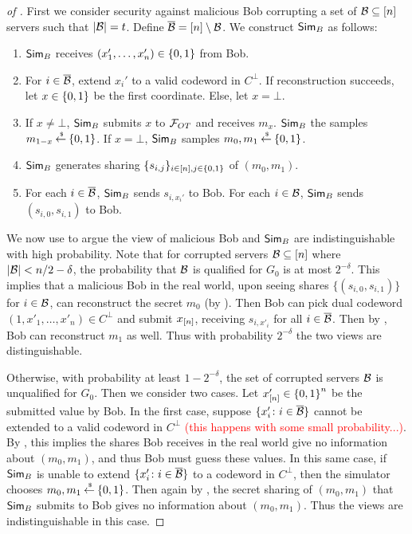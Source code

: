 \begin{proof}[of ]
	First we consider security against malicious Bob corrupting a set of ${\mathcal B} \subseteq[n]$ servers such that $|{\mathcal B}| = t$.
	Define $\overline{{\mathcal B}} = [n]\setminus{\mathcal B}$.
	We construct $\mathsf{Sim}_B$ as follows:
	\begin{enumerate}
		\item $\mathsf{Sim}_B$ receives $(x_1',\dotsc, x_n') \in {\{0,1\}}$ from Bob.
		\item For $i \in \overline{{\mathcal B}}$, extend $x_i'$ to a valid codeword in $C^\perp$.
		If reconstruction succeeds, let $x \in {\{0,1\}}$ be the first coordinate.
		Else, let $x = \bot$.
		\item If $x \neq \bot$, $\mathsf{Sim}_B$ submits $x$ to ${\mathcal F}_{OT}$ and receives $m_x$.
		$\mathsf{Sim}_B$ the samples $m_{1-x} \mathbin{\stackrel{\mbox{\,\tiny \$}}{\gets}} {\{0,1\}}$.
		If $x = \bot$, $\mathsf{Sim}_B$ samples $m_0,m_1 \mathbin{\stackrel{\mbox{\,\tiny \$}}{\gets}} {\{0,1\}}$.
		\item $\mathsf{Sim}_B$ generates sharing $\{ s_{i,j} \}_{i \in [n], j \in {\{0,1\}}}$ of $(m_0, m_1)$.
		\item For each $i \in \overline{{\mathcal B}}$, $\mathsf{Sim}_B$ sends $s_{i, x_i'}$ to Bob.
		For each $i \in {\mathcal B}$, $\mathsf{Sim}_B$ sends $(s_{i,0}, s_{i,1})$ to Bob.
	\end{enumerate}
	We now use  to argue the view of malicious Bob and $\mathsf{Sim}_B$ are indistinguishable with high probability.
	Note that for corrupted servers ${\mathcal B} \subseteq [n]$ where $|{\mathcal B}| < n/2 - \delta$, the probability that ${\mathcal B}$ is qualified for $G_0$ is at most $2^{-\delta}$.
	This implies that a malicious Bob in the real world, upon seeing shares $\{ (s_{i,0}, s_{i,1}) \}$ for $i \in {\mathcal B}$, can reconstruct the secret $m_0$ (by ).
	Then Bob can pick dual codeword $(1, x'_1,\dotsc,x'_n) \in C^\perp$ and submit $x_{[n]}$, receiving $s_{i, x'_i}$ for all $i \in \overline{{\mathcal B}}$.
	Then by , Bob can reconstruct $m_1$ as well.
	Thus with probability $2^{-\delta}$ the two views are distinguishable.
	
	Otherwise, with probability at least $1 - 2^{-\delta}$, the set of corrupted servers ${\mathcal B}$ is unqualified for $G_0$.
	Then we consider two cases.
	Let $x'_{[n]} \in {\{0,1\}}^n$ be the submitted value by Bob.
	In the first case, suppose $\{ x_i' \colon i \in \overline{{\mathcal B}} \}$ cannot be extended to a valid codeword in $C^\perp$ \textcolor{red}{(this happens with some small probability...)}.
	By , this implies the shares Bob receives in the real world give no information about $(m_0,m_1)$, and thus Bob must guess these values.
	In this same case, if $\mathsf{Sim}_B$ is unable to extend $\{ x_i' \colon i \in \overline{{\mathcal B}} \}$ to a codeword in $C^\perp$, then the simulator chooses $m_0, m_1 \mathbin{\stackrel{\mbox{\,\tiny \$}}{\gets}} {\{0,1\}}$.
	Then again by , the secret sharing of $(m_0, m_1)$ that $\mathsf{Sim}_B$ submits to Bob gives no information about $(m_0,m_1)$.
	Thus the views are indistinguishable in this case.
	

\end{proof}
